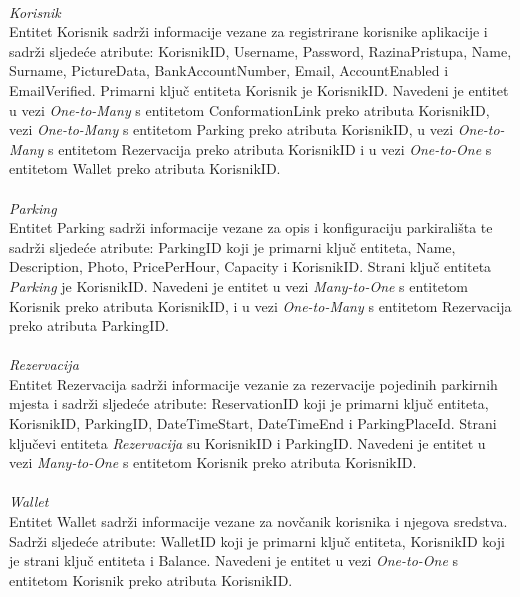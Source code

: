 \paragraph{}
{\emph{Korisnik\\}
Entitet Korisnik sadrži informacije vezane za registrirane korisnike aplikacije i sadrži sljedeće atribute:
KorisnikID, Username, Password, RazinaPristupa, Name, Surname, PictureData, BankAccountNumber, Email, AccountEnabled i EmailVerified. 
Primarni ključ entiteta Korisnik je KorisnikID. 
Navedeni je entitet u vezi \emph{One-to-Many} s entitetom ConformationLink preko atributa KorisnikID, 
vezi \emph{One-to-Many} s entitetom Parking preko atributa KorisnikID, 
u vezi \emph{One-to-Many} s entitetom Rezervacija preko atributa KorisnikID 
i u vezi \emph{One-to-One} s entitetom Wallet preko atributa KorisnikID.}

\paragraph{}
{\emph{Parking\\}
Entitet Parking sadrži informacije vezane za opis i konfiguraciju parkirališta te sadrži sljedeće atribute:
ParkingID koji je primarni ključ entiteta, Name, Description, Photo, PricePerHour, Capacity i KorisnikID. Strani ključ entiteta \emph{Parking} je KorisnikID.
Navedeni je entitet u vezi \emph{Many-to-One} s entitetom Korisnik preko atributa KorisnikID, 
i u vezi \emph{One-to-Many} s entitetom Rezervacija preko atributa ParkingID.
}
	
\paragraph{}
{\emph{Rezervacija\\}
Entitet Rezervacija sadrži informacije vezanie za rezervacije pojedinih parkirnih mjesta i sadrži sljedeće atribute:
ReservationID koji je primarni ključ entiteta, KorisnikID, ParkingID, DateTimeStart, DateTimeEnd i ParkingPlaceId. Strani ključevi entiteta \emph{Rezervacija} su KorisnikID i ParkingID.
Navedeni je entitet u vezi \emph{Many-to-One} s entitetom Korisnik preko atributa KorisnikID.
}
	
\paragraph{}
{\emph{Wallet}\\
Entitet Wallet sadrži informacije vezane za novčanik korisnika i njegova sredstva. Sadrži sljedeće atribute:
WalletID koji je primarni ključ entiteta, KorisnikID koji je strani ključ entiteta i Balance.
Navedeni je entitet u vezi \emph{One-to-One} s entitetom Korisnik preko atributa KorisnikID.
}
	


